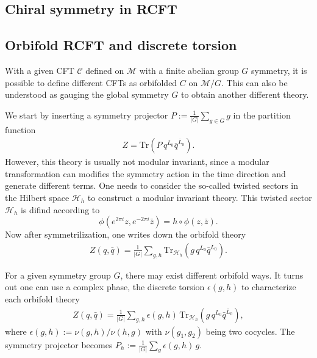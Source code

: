 \documentclass[submission, PhysLectNotes]{SciPost}
\begin{document}
\subsection{Chiral symmetry in RCFT}

\subsection{Orbifold RCFT and discrete torsion}
With a given CFT $\mathcal{C}$ defined on $\mathcal{M}$ with a finite abelian group $G$ symmetry, it is possible to define different CFTs as orbifolded $C$ on $\mathcal{M}/G$. This can also be understood as gauging the global symmetry $G$ to obtain another different theory. 

We start by inserting a symmetry projector $P := \frac{1}{|G|} \sum_{g \in G} g$ in the partition function 
\begin{equation}
	\begin{aligned}
		Z = \mathrm{Tr}\left( P\,q^{L_0} \bar{q}^{\bar{L}_0} \right).
	\end{aligned}
\end{equation}
However, this theory is usually not modular invariant, since a modular transformation can modifies the symmetry action in the time direction and generate different terms. One needs to consider the so-called twisted sectors in the Hilbert space $\mathcal{H}_h$ to construct a modular invariant theory. This twisted sector $\mathcal{H}_h$ is difind according to
\begin{equation}
	\phi(e^{2\pi i}z,e^{-2\pi i}\bar{z}) = h \circ \phi(z,\bar{z}).
\end{equation}
Now after symmetrilization, one writes down the orbifold theory
\begin{equation}
	\begin{aligned}
		Z(q,\bar{q}) = \frac{1}{|G|}\sum_{g,h}\mathrm{Tr}_{\mathcal{H}_h}\left( g \, q^{L_0} \bar{q}^{\bar{L}_0} \right).
	\end{aligned}
\end{equation}

For a given symmetry group $G$, there may exist different orbifold ways. It turns out one can use a complex phase, the discrete torsion $\epsilon(g,h)$ to characterize each orbifold theory
\begin{equation}
	\begin{aligned}
		Z(q,\bar{q}) = \frac{1}{|G|}  \sum_{g,h} \epsilon(g,h) \, \mathrm{Tr}_{\mathcal{H}_h}\left( g \, q^{L_0} \bar{q}^{\bar{L}_0} \right),
	\end{aligned}
\end{equation}
where $\epsilon(g,h) := \nu(g,h)/\nu(h,g)$ with $\nu(g_1,g_2)$ being two cocycles. The symmetry projector becomes $P_h := \frac{1}{|G|}\sum_g \epsilon(g,h)\,g$. 
\end{document}
